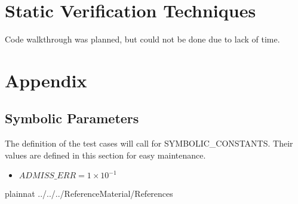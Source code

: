\documentclass[12pt, titlepage]{article}
\begin{document}
\section{Static Verification Techniques}

Code walkthrough was planned, but could not be done due to lack of time.

				


\newpage

\section{Appendix}



\subsection{Symbolic Parameters}

The definition of the test cases will call for SYMBOLIC\_CONSTANTS.
Their values are defined in this section for easy maintenance.
\begin{itemize}
	\item $ADMISS\_ERR = 1 \times 10^{-1}$
\end{itemize}





 {plainnat}
 {../../../ReferenceMaterial/References}
\end{document}
